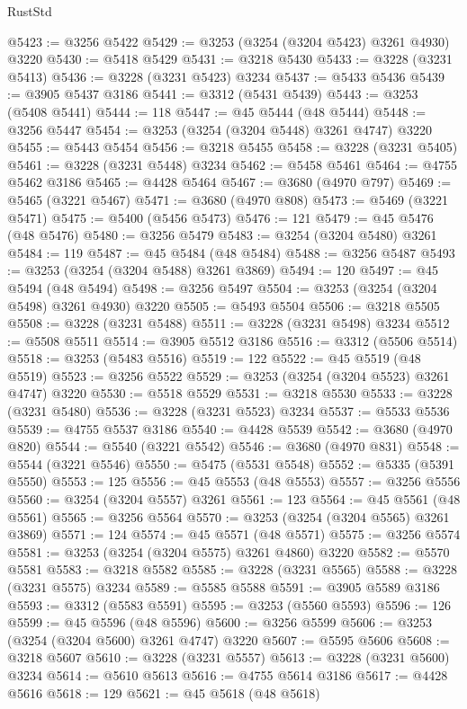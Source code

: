 \begin{lexlean}{RustStd}
\begin{coremodule}
@5423 := @3256 @5422
@5429 := @3253 (@3254 (@3204 @5423) @3261 @4930) @3220
@5430 := @5418 @5429
@5431 := @3218 @5430
@5433 := @3228 (@3231 @5413)
@5436 := @3228 (@3231 @5423) @3234
@5437 := @5433 @5436
@5439 := @3905 @5437 @3186
@5441 := @3312 (@5431 @5439)
@5443 := @3253 (@5408 @5441)
@5444 := 118
@5447 := @45 @5444 (@48 @5444)
@5448 := @3256 @5447
@5454 := @3253 (@3254 (@3204 @5448) @3261 @4747) @3220
@5455 := @5443 @5454
@5456 := @3218 @5455
@5458 := @3228 (@3231 @5405)
@5461 := @3228 (@3231 @5448) @3234
@5462 := @5458 @5461
@5464 := @4755 @5462 @3186
@5465 := @4428 @5464
@5467 := @3680 (@4970 @797)
@5469 := @5465 (@3221 @5467)
@5471 := @3680 (@4970 @808)
@5473 := @5469 (@3221 @5471)
@5475 := @5400 (@5456 @5473)
@5476 := 121
@5479 := @45 @5476 (@48 @5476)
@5480 := @3256 @5479
@5483 := @3254 (@3204 @5480) @3261
@5484 := 119
@5487 := @45 @5484 (@48 @5484)
@5488 := @3256 @5487
@5493 := @3253 (@3254 (@3204 @5488) @3261 @3869)
@5494 := 120
@5497 := @45 @5494 (@48 @5494)
@5498 := @3256 @5497
@5504 := @3253 (@3254 (@3204 @5498) @3261 @4930) @3220
@5505 := @5493 @5504
@5506 := @3218 @5505
@5508 := @3228 (@3231 @5488)
@5511 := @3228 (@3231 @5498) @3234
@5512 := @5508 @5511
@5514 := @3905 @5512 @3186
@5516 := @3312 (@5506 @5514)
@5518 := @3253 (@5483 @5516)
@5519 := 122
@5522 := @45 @5519 (@48 @5519)
@5523 := @3256 @5522
@5529 := @3253 (@3254 (@3204 @5523) @3261 @4747) @3220
@5530 := @5518 @5529
@5531 := @3218 @5530
@5533 := @3228 (@3231 @5480)
@5536 := @3228 (@3231 @5523) @3234
@5537 := @5533 @5536
@5539 := @4755 @5537 @3186
@5540 := @4428 @5539
@5542 := @3680 (@4970 @820)
@5544 := @5540 (@3221 @5542)
@5546 := @3680 (@4970 @831)
@5548 := @5544 (@3221 @5546)
@5550 := @5475 (@5531 @5548)
@5552 := @5335 (@5391 @5550)
@5553 := 125
@5556 := @45 @5553 (@48 @5553)
@5557 := @3256 @5556
@5560 := @3254 (@3204 @5557) @3261
@5561 := 123
@5564 := @45 @5561 (@48 @5561)
@5565 := @3256 @5564
@5570 := @3253 (@3254 (@3204 @5565) @3261 @3869)
@5571 := 124
@5574 := @45 @5571 (@48 @5571)
@5575 := @3256 @5574
@5581 := @3253 (@3254 (@3204 @5575) @3261 @4860) @3220
@5582 := @5570 @5581
@5583 := @3218 @5582
@5585 := @3228 (@3231 @5565)
@5588 := @3228 (@3231 @5575) @3234
@5589 := @5585 @5588
@5591 := @3905 @5589 @3186
@5593 := @3312 (@5583 @5591)
@5595 := @3253 (@5560 @5593)
@5596 := 126
@5599 := @45 @5596 (@48 @5596)
@5600 := @3256 @5599
@5606 := @3253 (@3254 (@3204 @5600) @3261 @4747) @3220
@5607 := @5595 @5606
@5608 := @3218 @5607
@5610 := @3228 (@3231 @5557)
@5613 := @3228 (@3231 @5600) @3234
@5614 := @5610 @5613
@5616 := @4755 @5614 @3186
@5617 := @4428 @5616
@5618 := 129
@5621 := @45 @5618 (@48 @5618)

\end{coremodule}
\end{lexlean}
